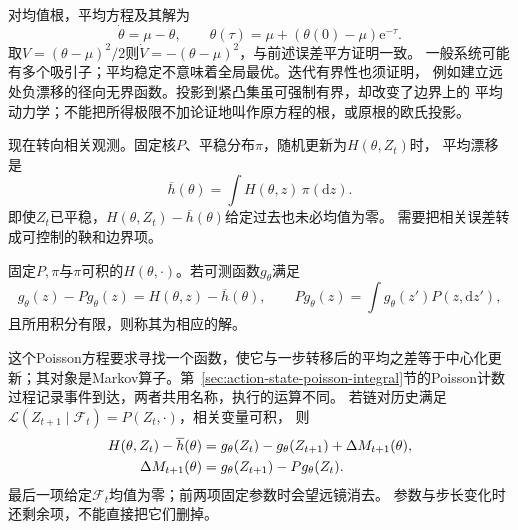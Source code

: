 对均值根，平均方程及其解为
\begin{equation}
  \dot\theta=\mu-\theta,\qquad
  \theta(\tau)=\mu+(\theta(0)-\mu)\mathrm e^{-\tau}.
  \label{eq:stoch-mean-root-ode-solution}
\end{equation}
取$V=(\theta-\mu)^2/2$则$\dot V=-(\theta-\mu)^2$，与前述误差平方证明一致。
一般系统可能有多个吸引子；平均稳定不意味着全局最优。迭代有界性也须证明，
例如建立远处负漂移的径向无界函数。投影到紧凸集虽可强制有界，却改变了边界上的
平均动力学；不能把所得极限不加论证地叫作原方程的根，或原根的欧氏投影。

现在转向相关观测。固定核$P$、平稳分布$\pi$，随机更新为$H(\theta,Z_t)$时，
平均漂移是
\begin{equation}
  \overline h(\theta)=\int H(\theta,z)\,\pi(\mathrm dz).
  \label{eq:stoch-markov-mean-field}
\end{equation}
即使$Z_t$已平稳，$H(\theta,Z_t)-\overline h(\theta)$给定过去也未必均值为零。
需要把相关误差转成可控制的鞅和边界项。
\begin{definition}[Markov核的Poisson方程]
  \label{def:stoch-markov-poisson-equation}
  固定$P,\pi$与$\pi$可积的$H(\theta,\cdot)$。若可测函数$g_\theta$满足
  \begin{equation}
    g_\theta(z)-Pg_\theta(z)=H(\theta,z)-\overline h(\theta),
    \qquad Pg_\theta(z)=\int g_\theta(z')P(z,\mathrm dz'),
    \label{eq:stoch-poisson-equation}
  \end{equation}
  且所用积分有限，则称其为相应的解。
\end{definition}
这个Poisson方程要求寻找一个函数，使它与一步转移后的平均之差等于中心化更新；其对象是Markov算子。第~\ref{sec:action-state-poisson-integral}节的Poisson计数过程记录事件到达，两者共用名称，执行的运算不同。
若链对历史满足$\mathcal L(Z_{t+1}\mid\mathcal F_t)=P(Z_t,\cdot)$，相关变量可积，
则
\begin{align}
  H(\theta,Z_t)-\overline h(\theta)
    &=g_\theta(Z_t)-g_\theta(Z_{t+1})+\Delta M_{t+1}(\theta),
       \label{eq:stoch-poisson-decomposition}\\
  \Delta M_{t+1}(\theta)&=g_\theta(Z_{t+1})-Pg_\theta(Z_t).\notag
\end{align}
最后一项给定$\mathcal F_t$均值为零；前两项固定参数时会望远镜消去。
参数与步长变化时还剩余项，不能直接把它们删掉。

